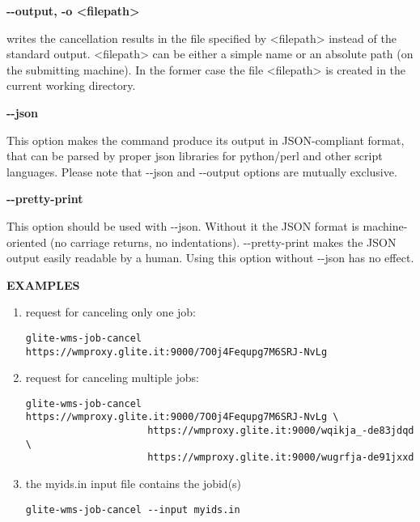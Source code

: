 \textbf{-{}-output, -o <filepath>}

writes the cancellation results in the file specified by <filepath> instead of the standard output. 
<filepath> can be either a simple name or an absolute path (on the submitting machine). 
In the former case the file <filepath> is created in the current working directory.





\textbf{-{}-json}

This option makes the command produce its output in JSON-compliant format, that can be 
parsed by proper json libraries for python/perl and other script languages. 
Please note that -{}-json and -{}-output options are mutually exclusive.





\textbf{-{}-pretty-print}

This option should be used with -{}-json. Without it the JSON format is machine-oriented 
(no carriage returns, no indentations). -{}-pretty-print makes the JSON output easily readable 
by a human. Using this option without -{}-json has no effect.





\medskip
\textbf{EXAMPLES}
\smallskip


\begin{enumerate}


\item  request for canceling only one job:
\begin{verbatim}
glite-wms-job-cancel https://wmproxy.glite.it:9000/7O0j4Fequpg7M6SRJ-NvLg
\end{verbatim}

\item  request for canceling multiple jobs:
\begin{verbatim}
glite-wms-job-cancel https://wmproxy.glite.it:9000/7O0j4Fequpg7M6SRJ-NvLg \
                     https://wmproxy.glite.it:9000/wqikja_-de83jdqd \
                     https://wmproxy.glite.it:9000/wugrfja-de91jxxd 
\end{verbatim}

\item  the myids.in input file contains the jobid(s)
\begin{verbatim}
glite-wms-job-cancel --input myids.in
\end{verbatim}

\end{enumerate}

